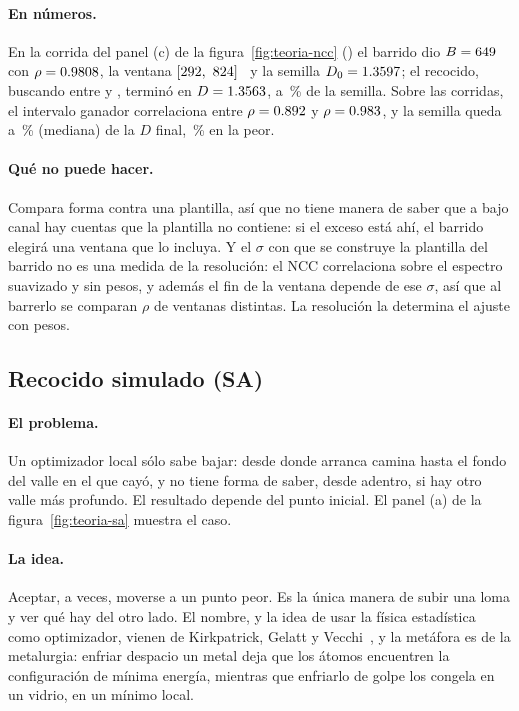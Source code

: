 \documentclass[11pt,a4paper]{article}
\begin{document}
\paragraph{En números.} En la corrida del panel (c) de la
figura~\ref{fig:teoria-ncc} (\EjCorrida) el barrido dio $B = 649$~\mVns{} con
$\rho = 0.9808$, la ventana $[292,\ 824]$~\mVns{} y la semilla
$D_0 = 1.3597$; el recocido, buscando entre \EjCotaDMin{} y \EjCotaDMax,
terminó en $D = 1.3563$, a \EjDesvSemilla\,\% de la semilla. Sobre las
\NCorridas{} corridas, el intervalo ganador correlaciona entre $\rho = 0.892$
y $\rho = 0.983$, y la semilla queda a \SemillaMediana\,\% (mediana) de la
$D$ final, \SemillaMax\,\% en la peor.

\paragraph{Qué no puede hacer.} Compara forma contra una plantilla, así que no
tiene manera de saber que a bajo canal hay cuentas que la plantilla no
contiene: si el exceso está ahí, el barrido elegirá una ventana que lo
incluya. Y el $\sigma$ con que se construye la plantilla del barrido no es una
medida de la resolución: el NCC correlaciona sobre el espectro suavizado y sin
pesos, y además el fin de la ventana depende de ese $\sigma$, así que al
barrerlo se comparan $\rho$ de ventanas distintas. La resolución la determina
el ajuste con pesos.

\subsection{Recocido simulado (SA)}
\label{sec:sa}

\paragraph{El problema.} Un optimizador local sólo sabe bajar: desde donde
arranca camina hasta el fondo del valle en el que cayó, y no tiene forma de
saber, desde adentro, si hay otro valle más profundo. El resultado depende del
punto inicial. El panel (a) de la figura~\ref{fig:teoria-sa} muestra el caso.

\paragraph{La idea.} Aceptar, a veces, moverse a un punto peor. Es la única
manera de subir una loma y ver qué hay del otro lado. El nombre, y la idea de
usar la física estadística como optimizador, vienen de Kirkpatrick, Gelatt y
Vecchi~\cite{kirkpatrick1983}, y la metáfora es de la metalurgia: enfriar despacio un metal deja que los átomos encuentren la
configuración de mínima energía, mientras que enfriarlo de golpe los congela en
un vidrio, en un mínimo local.
\end{document}
